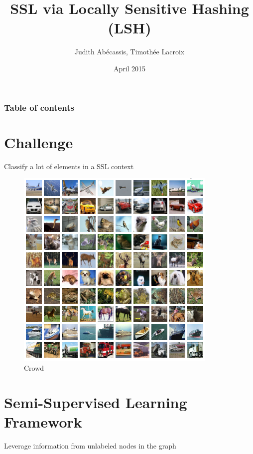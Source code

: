 \documentclass[11pt)]{beamer}
\author{Judith Abécassis, Timothée Lacroix}
\title{SSL via Locally Sensitive Hashing (LSH)}
\institute{Graphs in Machine Learning}
\date{April 2015}
\begin{document}
\begin{frame}
\titlepage
\end{frame}

{
  \begin{frame}
    \frametitle{Table of contents}
    \tableofcontents[currentsection]
  \end{frame}
}


\section{Challenge}
\begin{frame}{Classify a lot of elements in a SSL context}

		\begin{figure}[ht]
			\centering
			\includegraphics[width=\textwidth]{cifar-10.png}
			\caption{Crowd}
		\end{figure}


\end{frame}

\section{Semi-Supervised Learning Framework}
\begin{frame}{Leverage information from unlabeled nodes in the graph}

\end{frame}
\end{document}
